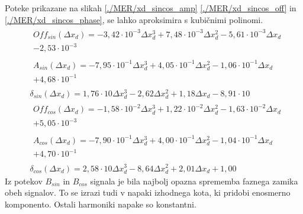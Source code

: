 Poteke prikazane na slikah \ref{./MER/xd_sincos_amp} \ref{./MER/xd_sincos_off} in \ref{./MER/xd_sincos_phase}, se lahko aproksimira s kubičnimi polinomi.
\begin{eqnarray}
&\begin{split}Off_{sin}(\Delta x_d) =-3,42\cdot 10^{-3}\Delta x_d^{3}+7,48\cdot 10^{-3}\Delta x_d^{2}-5,61\cdot 10^{-3}\Delta x_d\\-2,53\cdot 10^{-3} \end{split}\\
&\begin{split}A_{sin}(\Delta x_d) =-7,95\cdot 10^{-1}\Delta x_d^{3}+4,05\cdot 10^{-1}\Delta x_d^{2}-1,06\cdot 10^{-1}\Delta x_d\\+4,68\cdot 10^{-1} \end{split} \\  
&\delta_{sin}(\Delta x_d) =1,76\cdot 10\Delta x_d^{3}-2,62\Delta x_d^{2}+1,18\Delta x_d-8,91\cdot 10 \\                                  
&\begin{split}Off_{cos}(\Delta x_d) =-1,58\cdot 10^{-2}\Delta x_d^{3}+1,22\cdot 10^{-2}\Delta x_d^{2}-1,63\cdot 10^{-2}\Delta x_d\\+5,05\cdot 10^{-3} \end{split}\\
&\begin{split}A_{cos}(\Delta x_d) =-7,90\cdot 10^{-1}\Delta x_d^{3}+4,00\cdot 10^{-1}\Delta x_d^{2}-1,04\cdot 10^{-1}\Delta x_d\\+4,70\cdot 10^{-1} \end{split}\\  
&\delta_{cos}(\Delta x_d) =2,58\cdot 10\Delta x_d^{3}-8,64\Delta x_d^{2}+2,01\Delta x_d+1,00
\end{eqnarray}
Iz potekov $B_{sin}$ in $B_{cos}$ signala je bila najbolj opazna sprememba faznega zamika obeh signalov. To se izrazi tudi v napaki izhodnega kota, ki pridobi enosmerno komponento. Ostali harmoniki napake so konstantni.
